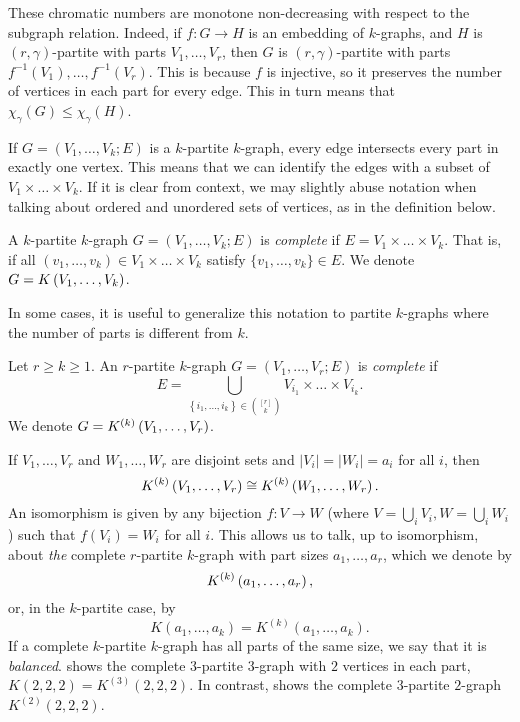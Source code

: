 \begin{remark}
    These chromatic numbers are monotone non-decreasing with respect to the subgraph relation.
    Indeed, if $f: G \to H$ is an embedding of $k$-graphs,
    and $H$ is $(r, \gamma)$-partite with parts $V_1, \dots, V_r$,
    then $G$ is $(r, \gamma)$-partite with parts $f^{-1}(V_1), \dots, f^{-1}(V_r)$.
    This is because $f$ is injective, so it preserves the number of vertices in each part for every edge.
    This in turn means that $\chi_{\gamma}(G) \leq \chi_{\gamma}(H)$.
\end{remark}

If $G = (V_1, \dots, V_k; E)$ is a $k$-partite $k$-graph,
every edge intersects every part in exactly one vertex.
This means that we can identify the edges with a subset of $ V_1 \times \dots \times V_k$.
If it is clear from context, we may slightly abuse notation when talking about ordered and
unordered sets of vertices, as in the definition below.


\begin{definition} \label{def:complete_kpartite}
    A $k$-partite $k$-graph $G = (V_1, \dots, V_k; E)$ is \emph{complete}
    if $E = V_1 \times \dots \times V_k$.
    That is, if all $(v_1, \dots, v_k) \in V_1 \times \dots \times V_k$
    satisfy $\{v_1, \dots, v_k\} \in E$.
    We denote $G = K\left(V_1, \dots, V_k\right)$.
\end{definition}

In some cases, it is useful to generalize this notation to partite $k$-graphs
where the number of parts is different from $k$.

\begin{definition}
    Let $r \geq k \geq 1$.
    An $r$-partite $k$-graph $G = (V_1, \dots, V_r; E)$ is \emph{complete} if
    \[
        E = \bigcup_{\left\{i_1, \dots, i_k \right\} \in \binom{[r]}{k}} V_{i_1} \times \dots \times V_{i_k}.
    \]
    We denote $G = K^{(k)}\left(V_1, \dots, V_r\right)$.

\end{definition}

If $V_1, \dots, V_r$ and $W_1, \dots, W_r$ are disjoint sets
and $|V_i| = |W_i| = a_i$ for all $i$, then
\[
    K^{(k)}\left(V_1, \dots, V_r\right) \cong K^{(k)}\left(W_1, \dots, W_r\right).
\]
An isomorphism is given by any bijection $f: V \to W$ (where $V=\bigcup_i V_i, W=\bigcup_i W_i$)
such that $f(V_i) = W_i$ for all $i$.
This allows us to talk, up to isomorphism, about \emph{the} complete $r$-partite $k$-graph
with part sizes $a_1, \dots, a_r$, which we denote by
\[
    K^{(k)}\left(a_1, \dots, a_r\right),
\]
or, in the $k$-partite case, by
\[
    K(a_1, \dots, a_k) = K^{(k)}(a_1, \dots, a_k).
\]
If a complete $k$-partite $k$-graph has all parts of the same size, we say that it is \emph{balanced}.
 shows the complete $3$-partite $3$-graph
with $2$ vertices in each part, $K(2, 2, 2) = K^{(3)}(2, 2, 2)$.
In contrast,  shows the complete $3$-partite $2$-graph
$K^{(2)}(2, 2, 2)$.

